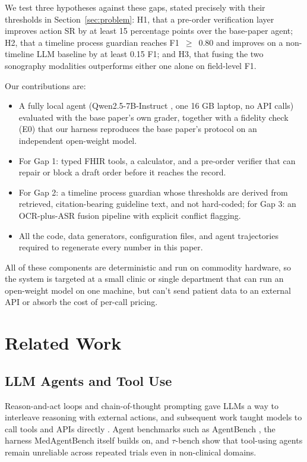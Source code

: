 \documentclass[conference]{IEEEtran}
\begin{document}
We test three hypotheses against these gaps, stated precisely with their thresholds in Section~\ref{sec:problem}: H1, that a pre-order verification layer improves action SR by at least 15 percentage points over the base-paper agent; H2, that a timeline process guardian reaches F1~$\geq$~0.80 and improves on a non-timeline LLM baseline by at least 0.15 F1; and H3, that fusing the two sonography modalities outperforms either one alone on field-level F1.

Our contributions are:
\begin{itemize}
\item A fully local agent (Qwen2.5-7B-Instruct \cite{qwen2025qwen25}, one 16 GB laptop, no API calls) evaluated with the base paper's own grader, together with a fidelity check (E0) that our harness reproduces the base paper's protocol on an independent open-weight model.
\item For Gap 1: typed FHIR tools, a calculator, and a pre-order verifier that can repair or block a draft order before it reaches the record.
\item For Gap 2: a timeline process guardian whose thresholds are derived from retrieved, citation-bearing guideline text, and not hard-coded; for Gap 3: an OCR-plus-ASR fusion pipeline with explicit conflict flagging.
\item All the code, data generators, configuration files, and agent trajectories required to regenerate every number in this paper.
\end{itemize}
All of these components are deterministic and run on commodity hardware, so the system is targeted at a small clinic or single department that can run an open-weight model on one machine, but can't send patient data to an external API or absorb the cost of per-call pricing.

\section{Related Work}

\subsection{LLM Agents and Tool Use}
Reason-and-act loops \cite{yao2023react} and chain-of-thought prompting \cite{wei2022cot} gave LLMs a way to interleave reasoning with external actions, and subsequent work taught models to call tools and APIs directly \cite{schick2023toolformer,patil2023gorilla}. Agent benchmarks such as AgentBench \cite{liu2024agentbench}, the harness MedAgentBench itself builds on, and $\tau$-bench \cite{yao2024taubench} show that tool-using agents remain unreliable across repeated trials even in non-clinical domains.
\end{document}
